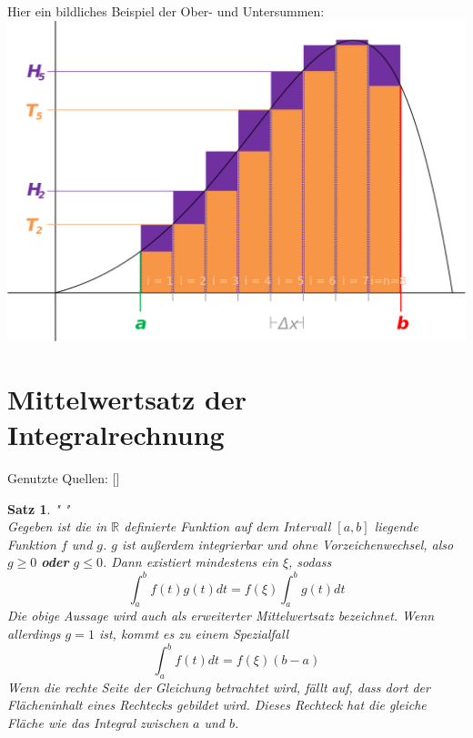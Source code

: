 \documentclass[fontsize=12pt,paper=a4,DIV12,cleardoublepage=empty, 
liststotoc,idxtotoc,bibtotoc]{article}
\newcommand{\RR}{\mathbb{R}}
\theoremstyle{plain}
\newtheorem{satz}{Satz}[subsection]
\theoremstyle{definition}
\begin{document}
	\\\\ Hier ein bildliches Beispiel der Ober- und Untersummen:\\
	\includegraphics[scale=0.3]{Riemann.png}
	
	
	\section{Mittelwertsatz der Integralrechnung}
	Genutzte Quellen: [\cite[vgl.]{MWS}]
	\begin{satz}" "\\
		Gegeben ist die in $\RR$ definierte Funktion auf dem Intervall $[a, b]$ liegende Funktion $f$ und $g$. $g$ ist außerdem integrierbar und ohne Vorzeichenwechsel, also $g \geq 0$ \textbf{oder} $g \leq 0$. Dann existiert mindestens ein $\xi$, sodass
		\begin{equation*}
			\int_{a}^{b}f(t)g(t)dt=f(\xi)\int_{a}^{b}g(t)dt			
		\end{equation*}
		Die obige Aussage wird auch als erweiterter Mittelwertsatz bezeichnet. Wenn allerdings $g=1$ ist, kommt es zu einem Spezialfall\\
		\begin{equation*}
			\int_{a}^{b}f(t)dt=f(\xi)(b-a)
		\end{equation*}
		Wenn die rechte Seite der Gleichung betrachtet wird, fällt auf, dass dort der Flächeninhalt eines Rechtecks gebildet wird. Dieses Rechteck hat die gleiche Fläche wie das Integral zwischen $a$ und $b$.		
		
	\end{satz}
	
\end{document}

